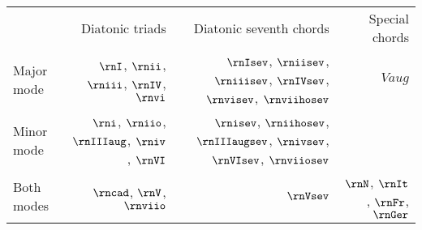 \begin{tabular}{lrrr}
            & Diatonic triads                                & Diatonic seventh chords                                                       & Special chords        \\
Major mode & $\rnI$, $\rnii$, $\rniii$, $\rnIV$, $\rnvi$     & $\rnIsev$, $\rniisev$, $\rniiisev$, $\rnIVsev$, $\rnvisev$, $\rnviihosev$     & $Vaug$                \\
Minor mode & $\rni$, $\rniio$, $\rnIIIaug$, $\rniv$, $\rnVI$ & $\rnisev$, $\rniihosev$, $\rnIIIaugsev$, $\rnivsev$, $\rnVIsev$, $\rnviiosev$ &                       \\
Both modes & $\rncad$, $\rnV$, $\rnviio$                     & $\rnVsev$                                                                     & $\rnN$, $\rnIt$, $\rnFr$, $\rnGer$
\end{tabular}
